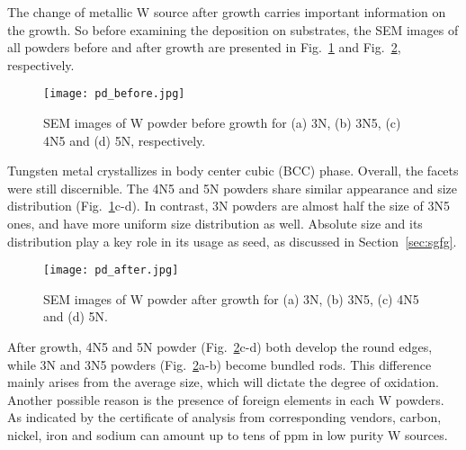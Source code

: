 The change of metallic W source after growth carries important information on the growth. So before examining the deposition on substrates, the SEM images of all powders before and after growth are presented in Fig.~\ref{fig:pdbefore} and Fig.~\ref{fig:pdafter}, respectively.
\begin{figure}[htb]
\centering
\texttt{[image: pd\_before.jpg]}
\caption[SEM images of W powder before growth]{SEM images of W powder before growth for (a) 3N, (b) 3N5, (c) 4N5 and (d) 5N, respectively.}
\label{fig:pdbefore}
\end{figure}
Tungsten metal crystallizes in body center cubic (BCC) phase. Overall, the facets were still discernible. The 4N5 and 5N powders share similar appearance and size distribution (Fig.~\ref{fig:pdbefore}c-d). In contrast, 3N powders are almost half the size of 3N5 ones, and have more uniform size distribution as well. Absolute size and its distribution play a key role in its usage as seed, as discussed in Section~\ref{sec:sgfg}.
\begin{figure}[htb]
\centering
\texttt{[image: pd\_after.jpg]}
\caption[SEM images of W powder after growth]{SEM images of W powder after growth for (a) 3N, (b) 3N5, (c) 4N5 and (d) 5N. }
\label{fig:pdafter}
\end{figure}
After growth, 4N5 and 5N powder (Fig.~\ref{fig:pdafter}c-d) both develop the round edges, while 3N and 3N5 powders (Fig.~\ref{fig:pdafter}a-b) become bundled rods. This difference mainly arises from the average size, which will dictate the degree of oxidation. Another possible reason is the presence of foreign elements in each W powders. As indicated by the certificate of analysis from corresponding vendors, carbon, nickel, iron and sodium can amount up to tens of ppm in low purity W sources. 

